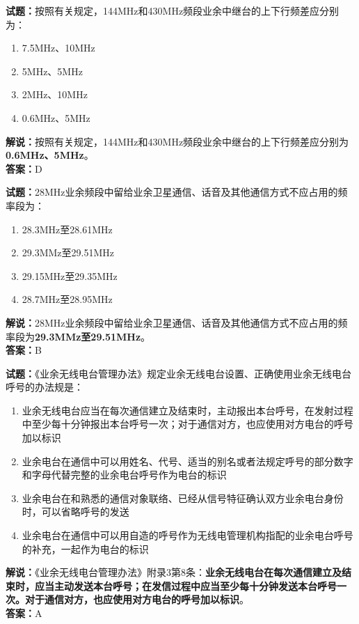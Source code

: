 \documentclass{ctexbook}
\begin{document}
\bigskip




\noindent\textbf{试题：}按照有关规定，144\unit{\MHz}和430\unit{\MHz}频段业余中继台的上下行频差应分别为：
\begin{enumerate}[leftmargin=3em]
\item 7.5\unit{\MHz}、10\unit{\MHz}
\item 5\unit{\MHz}、5\unit{\MHz}
\item 2\unit{\MHz}、10\unit{\MHz}
\item 0.6\unit{\MHz}、5\unit{\MHz}%
\end{enumerate}
\noindent\textbf{解说：}按照有关规定，144\unit{\MHz}和430\unit{\MHz}频段业余中继台的上下行频差应分别为\textbf{0.6\unit{\MHz}、5\unit{\MHz}}。\\\noindent\textbf{答案：}D

\bigskip




\noindent\textbf{试题：}28\unit{\MHz}业余频段中留给业余卫星通信、话音及其他通信方式不应占用的频率段为：
\begin{enumerate}[leftmargin=3em]
\item 28.3\unit{\MHz}至28.61\unit{\MHz}
\item 29.3MMz至29.51\unit{\MHz}
\item 29.15\unit{\MHz}至29.35\unit{\MHz}
\item 28.7\unit{\MHz}至28.95\unit{\MHz}
\end{enumerate}
\noindent\textbf{解说：}28\unit{\MHz}业余频段中留给业余卫星通信、话音及其他通信方式不应占用的频率段为\textbf{29.3MMz至29.51\unit{\MHz}}。\\\noindent\textbf{答案：}B

\bigskip




\noindent\textbf{试题：}《业余无线电台管理办法》规定业余无线电台设置、正确使用业余无线电台呼号的办法规是：
\begin{enumerate}[leftmargin=3em]
\item 业余无线电台应当在每次通信建立及结束时，主动报出本台呼号，在发射过程中至少每十分钟报出本台呼号一次；对于通信对方，也应使用对方电台的呼号加以标识
\item 业余电台在通信中可以用姓名、代号、适当的别名或者法规定呼号的部分数字和字母代替完整的业余电台呼号作为电台的标识
\item 业余电台在和熟悉的通信对象联络、已经从信号特征确认双方业余电台身份时，可以省略呼号的发送
\item 业余电台在通信中可以用自造的呼号作为无线电管理机构指配的业余电台呼号的补充，一起作为电台的标识
\end{enumerate}
\noindent\textbf{解说：}《业余无线电台管理办法》附录3第8条：\textbf{业余无线电台在每次通信建立及结束时，应当主动发送本台呼号；在发信过程中应当至少每十分钟发送本台呼号一次。对于通信对方，也应使用对方电台的呼号加以标识}。\\\noindent\textbf{答案：}A
\end{document}
